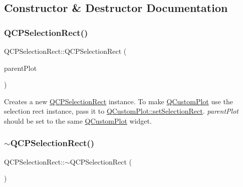 \subsection{Constructor \& Destructor Documentation}
\mbox{\label{class_q_c_p_selection_rect_ade6ee59fabcc585a1e281eb527b01867}} 
\subsubsection{\texorpdfstring{Q\+C\+P\+Selection\+Rect()}{QCPSelectionRect()}}
{\footnotesize\ttfamily Q\+C\+P\+Selection\+Rect\+::\+Q\+C\+P\+Selection\+Rect (\begin{DoxyParamCaption}\item[{\hyperlink{class_q_custom_plot}{Q\+Custom\+Plot} $\ast$}]{parent\+Plot }\end{DoxyParamCaption})\hspace{0.3cm}{\ttfamily [explicit]}}

Creates a new \hyperlink{class_q_c_p_selection_rect}{Q\+C\+P\+Selection\+Rect} instance. To make \hyperlink{class_q_custom_plot}{Q\+Custom\+Plot} use the selection rect instance, pass it to \hyperlink{class_q_custom_plot_a0c09f96df15faa4799ad7051bb16cf33}{Q\+Custom\+Plot\+::set\+Selection\+Rect}. {\itshape parent\+Plot} should be set to the same \hyperlink{class_q_custom_plot}{Q\+Custom\+Plot} widget. \mbox{\label{class_q_c_p_selection_rect_aded186aabcdc3ee51775b7c5063e199a}} 
\subsubsection{\texorpdfstring{$\sim$\+Q\+C\+P\+Selection\+Rect()}{~QCPSelectionRect()}}
{\footnotesize\ttfamily Q\+C\+P\+Selection\+Rect\+::$\sim$\+Q\+C\+P\+Selection\+Rect (\begin{DoxyParamCaption}{ }\end{DoxyParamCaption})\hspace{0.3cm}{\ttfamily [virtual]}}



